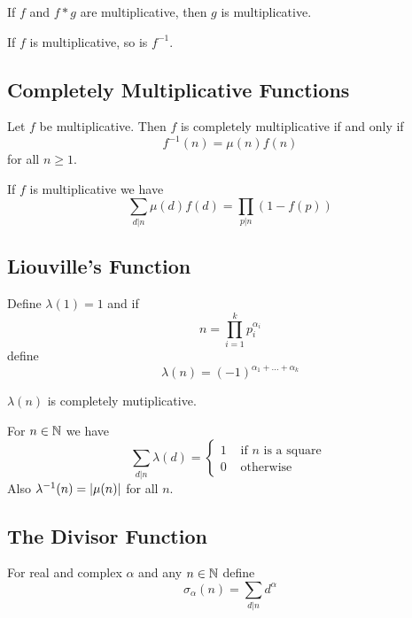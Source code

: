\documentclass[a4paper]{article}
\begin{document}
\begin{prp} If $f$ and $f\ast g$ are multiplicative, then $g$ is multiplicative. 
\end{prp}

\begin{prp} If $f$ is multiplicative, so is $f^{-1}$. 
\end{prp}

\subsection{Completely Multiplicative Functions}
\begin{thm} Let $f$ be multiplicative. Then $f$ is completely multiplicative if and only if $$f^{-1}(n)=\mu(n)f(n)$$ for all $n\geq 1$. 
\end{thm}

\begin{thm} If $f$ is multiplicative we have $$\sum_{d|n}\mu(d)f(d)=\prod_{p|n}(1-f(p))$$
\end{thm}

\subsection{Liouville's Function}
\begin{defn} Define $\lambda(1)=1$ and if $$n=\prod_{i=1}^kp_i^{\alpha_i}$$ define $$\lambda(n)=(-1)^{\alpha_1+\dots+\alpha_k}$$
\end{defn}

\begin{prp} $\lambda(n)$ is completely mutiplicative. 
\end{prp}

\begin{thm} For $n\in\mathbb{N}$ we have $$\sum_{d|n}\lambda(d)=\begin{cases}
1 & \text{ if } n \text{ is a square }\\
0 & \text{ otherwise }
\end{cases}$$ Also $\lambda^{-1}(n)=\abs{\mu(n)}$ for all $n$. 
\end{thm}

\subsection{The Divisor Function}
\begin{defn} For real and complex $\alpha$ and any $n\in\mathbb{N}$ define $$\sigma_\alpha(n)=\sum_{d|n}d^\alpha$$
\end{defn}
\end{document}
